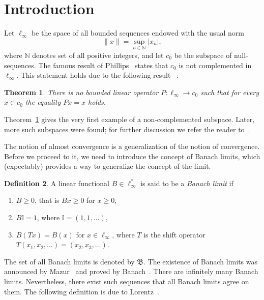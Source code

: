 \documentclass[a4paper,10pt]{article} %
\theoremstyle{plain}
\newtheorem{theorem}{Theorem}[section]
\theoremstyle{definition}
\newtheorem{definition}[theorem]{Definition}
\begin{document}
\section{Introduction}

Let $\ell_\infty$ be the space of all bounded sequences
endowed with the usual norm
\begin{equation}
	\|x\| = \sup_{n\in\mathbb{N}} |x_n|
	,
\end{equation}
where $\mathbb{N}$ denotes set of all positive integers,
and let $c_0$ be the subspace  of null-sequences.
The famous result of Phillips~\cite{phillips1940linear}
states that $c_0$ is not complemented in $\ell_\infty$.
This statement holds due to the following result~\cite{phillips1940linear} :

\begin{theorem}
	\label{thm:phillips}
	There is no bounded linear operator $P: \ell_\infty \to c_0$ such that for every
	$x \in c_0$ the equality $Px =x$ holds.
\end{theorem}

Theorem~\ref{thm:phillips} gives the very first example of a non-complemented subspace.
Later, more such subspaces were found;
for further discussion we refer the reader to~\cite[2.c--2.f]{lindenstrauss1977classical}.

The notion of almost convergence is a generalization of the notion of convergence.
Before we proceed to it, we need to introduce the concept of Banach limits,
which (expectably) provides a way to generalize the concept of the limit.

\begin{definition}
	A linear functional $B\in\ell_\infty^*$ is said to be a \emph{Banach limit} if
	\begin{enumerate}[label=(\roman*)]
		\item
			$B\geq0$, that is $Bx \geq 0$ for $x \geq 0$,
		\item
			$B\mathbb{I}=1$, where $\mathbb{I} =(1,1,\ldots)$,
		\item
			$B(Tx)=B(x)$ for $x\in \ell_\infty$,
			where $T$ is the shift operator $T(x_1,x_2,\ldots)=(x_2,x_3,\ldots)$.
	\end{enumerate}
\end{definition}
The set of all Banach limits is denoted by $\mathfrak{B}$.
The existence of Banach limits was announced by Mazur~\cite{Mazur} and proved by Banach~\cite{banach1993theorie}.
There are infinitely many Banach limits.
Nevertheless, there exist such sequences that all Banach limits agree on them.
The following definition is due to Lorentz~\cite{lorentz1948contribution}.
\end{document}
